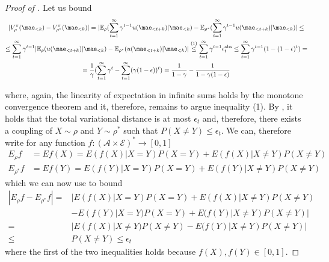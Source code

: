 \begin{proof}[Proof of ]
Let us bound
\begin{gather}
|V_{\rho}^{\pi}(\mae_{<k}) - V_{\rho^*}^\pi(\mae_{<k})| = |\mathbb{E}_{\rho}(\sum_{t=1}^\infty \gamma^{t-1} u(\mae_{<t+k}) | \mae_{<k}) - \mathbb{E}_{\rho^*}(\sum_{t=1}^\infty \gamma^{t-1} u(\mae_{<t+k}) | \mae_{<k})| \leq \\
\leq \sum_{t=1}^\infty \gamma^{t-1} |\mathbb{E}_\rho (u(\mae_{<t+k}) | \mae_{<k}) - \mathbb{E}_{\rho^*} (u(\mae_{<t+k}) | \mae_{<k})| \stackrel{(1)}{\leq} \sum_{t=1}^\infty \gamma^{t-1} \epsilon_t^\text{abs}  \leq \sum_{t=1}^\infty \gamma^{t-1}(1-(1-\epsilon)^t) = \\
= \frac{1}{\gamma}(\sum_{t=1}^\infty \gamma^{t} - \sum_{t=1}^\infty (\gamma(1-\epsilon))^t) = \frac{1}{1-\gamma} - \frac{1}{1- \gamma(1-\epsilon)}
\end{gather}

where, again, the linearity of expectation in infinite sums holds by the monotone convergence theorem and it, therefore, remains to argue inequality (1). By , it holds that the total variational distance is at most $\epsilon_t$ and, therefore, there exists a coupling of $X \sim \rho$ and $Y \sim \rho^*$ such that $P(X \neq Y) \leq \epsilon_t$. We can, therefore write for any function $f: (\mathcal{A \times E})^* \rightarrow [0,1]$
\begin{align}
E_\rho f &= E f(X) = E(f(X) | X = Y)P(X = Y) + E(f(X) | X \neq Y)P(X \neq Y) \\
E_{\rho^*} f &= E f(Y) = E(f(Y) | X = Y)P(X = Y) + E(f(Y) | X \neq Y)P(X \neq Y)
\end{align}
which we can now use to bound
\begin{align}
|E_\rho f - E_{\rho^*} f| =& |E(f(X) | X = Y)P(X = Y) + E(f(X) | X \neq Y)P(X \neq Y) \\&- E(f(Y) | X = Y)P(X = Y) + E(f(Y) | X \neq Y)P(X \neq Y)|\\
=& |E(f(X) | X \neq Y)P(X \neq Y) - E(f(Y) | X \neq Y)P(X \neq Y)|\\
\leq& P(X \neq Y) \leq \epsilon_t
\end{align}
where the first of the two inequalities holds because $f(X), f(Y) \in [0,1]$.


\end{proof}

